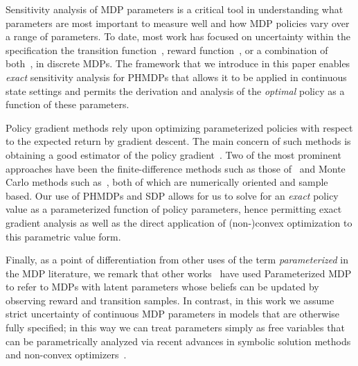 Sensitivity analysis of MDP parameters is a critical tool in understanding what parameters are most important to measure well and how MDP policies vary over a range of parameters.  To date, most work has focused on uncertainty within the specification the transition function~\parencite{Kalyanasundaram_AJC_2004}, reward function~\parencite{Tan_JAP_2011, Hopp_JOTA_1988}, or a combination of both~\parencite{Givan_AI_2000}, in discrete MDPs. The framework that we introduce in this paper enables \textit{exact} sensitivity analysis for PHMDPs that allows it to be applied in continuous state settings and permits the derivation and analysis of the \emph{optimal} policy as a function of these parameters.

Policy gradient methods rely upon optimizing parameterized policies with respect to the expected return by gradient descent. The main
concern of such methods is obtaining a good estimator of the policy gradient~\parencite{Peters_IRS_2006}. Two of the most prominent
approaches have been the finite-difference methods such as those of~\parencite{Ng_UAI_2000} and Monte Carlo methods such as~\parencite{Sutton_NIPS_1999,Baxter_ISCAS_2000}, both of which are numerically oriented and sample based. Our use of PHMDPs and SDP allows for us to solve for an \emph{exact} policy value as a parameterized function of policy parameters, hence permitting exact gradient analysis as well as the direct application of (non-)convex optimization to this parametric value form.

Finally, as a point of differentiation from other uses of the term \emph{parameterized} in the MDP literature, we remark that other works~\parencite{Duff_UMA_2002,Dearden_UAI_1999,Gopalan_COLT_2015} have used Parameterized MDP to refer to MDPs with latent parameters whose beliefs can be updated by observing reward and transition samples. In contrast, in this work we assume strict uncertainty of continuous MDP parameters in models that are otherwise fully specified; in this way we can treat parameters simply as free variables that can be parametrically analyzed via recent advances in symbolic solution methods and non-convex optimizers~\parencite{Gao2013}.


